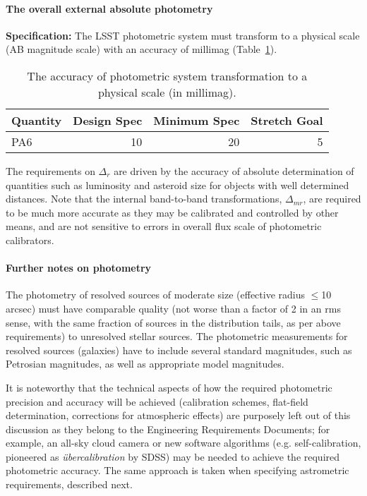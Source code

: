 \paragraph{The overall external absolute photometry\\}

{\bf Specification:} The LSST photometric system must transform to a
physical scale (\eg AB magnitude scale) with an accuracy of
millimag (Table~\ref{ToffsetsAB}).

\begin{table}[h]
\begin{tabular}{|l|r|r|r|}
\hline
Quantity   & Design Spec  & Minimum Spec & Stretch Goal   \\
\hline
     PA6  &     10       &       20     &       5         \\
\hline
\end{tabular}
\caption{The accuracy of photometric system transformation to a physical scale
(in millimag). }
\label{ToffsetsAB}
\end{table}

The requirements on $\Delta_{r}$ are driven by the accuracy of absolute determination of
quantities such as luminosity and asteroid size for objects with well
determined distances. Note that the internal band-to-band transformations,
$\Delta_{mr}$, are required to be much more accurate as they may be calibrated
and controlled by other means, and are not sensitive to errors in overall
flux scale of photometric calibrators.



\paragraph{Further notes on photometry\\}


The photometry of resolved sources of moderate size (effective radius $\le$10
arcsec) must
have comparable quality (not worse than a factor of 2 in an rms sense, with the
same fraction of sources in the distribution tails, as per above requirements)
to unresolved stellar sources. The photometric measurements for resolved sources
(galaxies) have to include several standard magnitudes, such as Petrosian magnitudes,
as well as appropriate model magnitudes.

It is noteworthy that the technical aspects of how the required photometric precision
and accuracy will be achieved (\eg calibration schemes,
flat-field determination, corrections for atmospheric effects) are purposely
left out of this discussion as they belong to the Engineering Requirements
Documents; for example, an all-sky cloud camera or new software algorithms
(e.g. self-calibration, pioneered as {\it \"{u}bercalibration} by SDSS)
may be needed to achieve the required photometric accuracy. The same
approach is taken when specifying astrometric requirements, described next.



